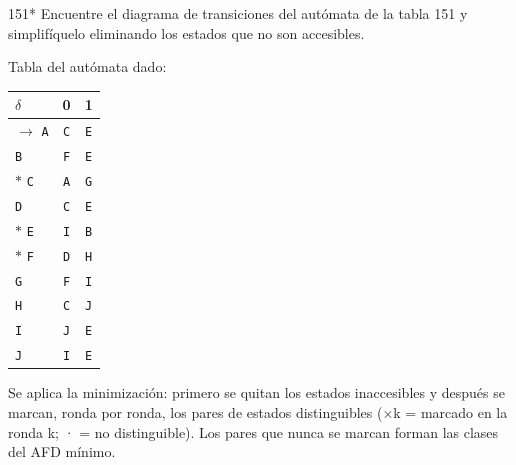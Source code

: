 \documentclass[11pt]{article}
\begin{document}
\begin{ejercicio}{151}{*}
Encuentre el diagrama de transiciones del autómata de la tabla 151 y simplifíquelo eliminando los estados que no son accesibles.
\end{ejercicio}
\proc Tabla del autómata dado:
\begin{center}\small\begin{tabular}{lcc}\toprule
$\delta$ & 0 & 1 \\\midrule
$\to$ \texttt{A} & \texttt{C} & \texttt{E} \\
 \texttt{B} & \texttt{F} & \texttt{E} \\
$*$ \texttt{C} & \texttt{A} & \texttt{G} \\
 \texttt{D} & \texttt{C} & \texttt{E} \\
$*$ \texttt{E} & \texttt{I} & \texttt{B} \\
$*$ \texttt{F} & \texttt{D} & \texttt{H} \\
 \texttt{G} & \texttt{F} & \texttt{I} \\
 \texttt{H} & \texttt{C} & \texttt{J} \\
 \texttt{I} & \texttt{J} & \texttt{E} \\
 \texttt{J} & \texttt{I} & \texttt{E} \\
\bottomrule\end{tabular}\end{center}
Se aplica la minimización: primero se quitan los estados inaccesibles y después se marcan, ronda por ronda, los pares de estados distinguibles (×k = marcado en la ronda k; · = no distinguible). Los pares que nunca se marcan forman las clases del AFD mínimo.
\end{document}
